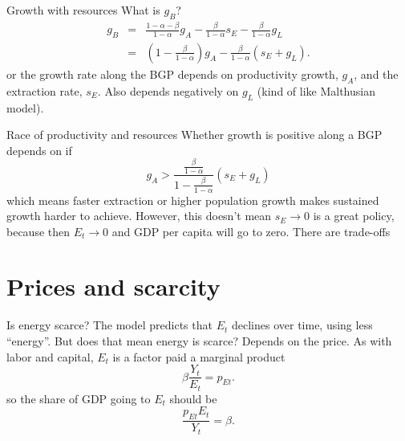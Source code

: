 \begin{frame}{Growth with resources}
What is $g_B$?
\begin{eqnarray}
	g_B &=& \frac{1-\alpha-\beta}{1-\alpha}g_A - \frac{\beta}{1-\alpha} s_E - \frac{\beta}{1-\alpha} g_L \\ \label{EQ_g_B}
	   &=& \left(1 - \frac{\beta}{1-\alpha}\right)g_A - \frac{\beta}{1-\alpha}\left(s_E + g_L \right). \nonumber
\end{eqnarray}
or the growth rate along the BGP depends on productivity growth, $g_A$, and the extraction rate, $s_E$. Also depends negatively on $g_L$ (kind of like Malthusian model).
\end{frame}

\begin{frame}{Race of productivity and resources}
Whether growth is positive along a BGP depends on if
\begin{equation}
	g_A > \frac{\frac{\beta}{1-\alpha}}{1 - \frac{\beta}{1-\alpha}}(s_E + g_L)
\end{equation}
which means faster extraction or higher population growth makes sustained growth harder to achieve.
\vspace{.25in}\noindent
However, this doesn't mean $s_E \rightarrow 0$ is a great policy, because then $E_t \rightarrow 0$ and GDP per capita will go to zero. There are trade-offs
\end{frame}

\section{Prices and scarcity}
\begin{frame}{Is energy scarce?}
The model predicts that $E_t$ declines over time, using less ``energy''. But does that mean energy is scarce? Depends on the price. As with labor and capital, $E_t$ is a factor paid a marginal product
\begin{equation}
	\beta \frac{Y_t}{E_t} = p_{Et}. \nonumber
\end{equation}
so the share of GDP going to $E_t$ should be
\begin{equation}
	\frac{p_{Et} E_t}{Y_t} = \beta. \label{EQ_factor_E}
\end{equation}
\end{frame}

